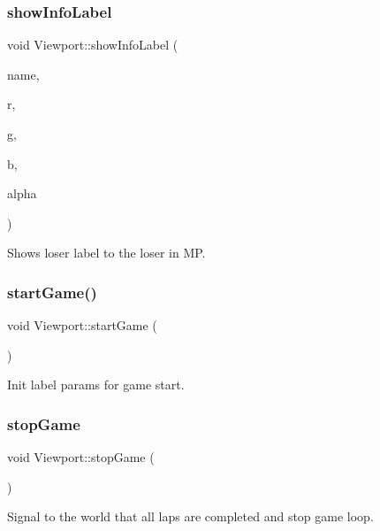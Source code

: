 \subsubsection{\texorpdfstring{showInfoLabel}{showInfoLabel}}
{\footnotesize\ttfamily void Viewport\+::show\+Info\+Label (\begin{DoxyParamCaption}\item[{Q\+String}]{name,  }\item[{int}]{r,  }\item[{int}]{g,  }\item[{int}]{b,  }\item[{int}]{alpha }\end{DoxyParamCaption})\hspace{0.3cm}{\ttfamily [slot]}}



Shows loser label to the loser in MP. 

\mbox{\label{class_viewport_aaa69f6d1141316cace3925e861189b3c}} 
\subsubsection{\texorpdfstring{startGame()}{startGame()}}
{\footnotesize\ttfamily void Viewport\+::start\+Game (\begin{DoxyParamCaption}{ }\end{DoxyParamCaption})}



Init label params for game start. 

\mbox{\label{class_viewport_a760083af13499cfcd0bf3edcdd1cb667}} 
\subsubsection{\texorpdfstring{stopGame}{stopGame}}
{\footnotesize\ttfamily void Viewport\+::stop\+Game (\begin{DoxyParamCaption}{ }\end{DoxyParamCaption})\hspace{0.3cm}{\ttfamily [signal]}}



Signal to the world that all laps are completed and stop game loop. 

